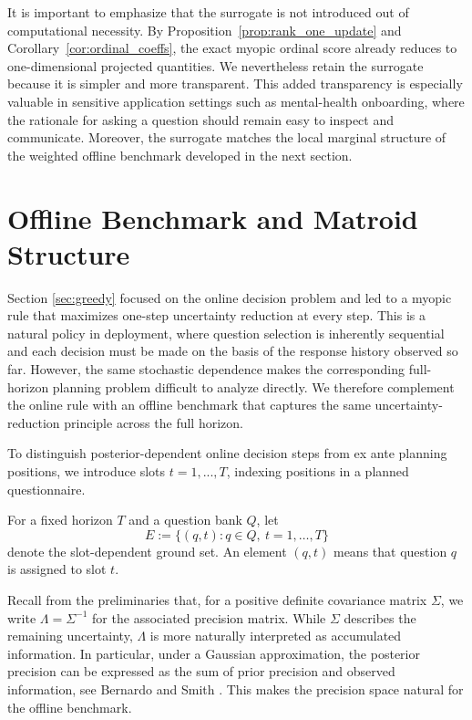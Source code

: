 \documentclass{article}
\begin{document}
It is important to emphasize that the surrogate is not introduced out of
computational necessity. By Proposition~\ref{prop:rank_one_update} and
Corollary~\ref{cor:ordinal_coeffs}, the exact myopic ordinal score already reduces
to one-dimensional projected quantities. We nevertheless retain the surrogate
because it is simpler and more transparent. This added
transparency is especially valuable in sensitive application settings such as
mental-health onboarding, where the rationale for asking a question should remain
easy to inspect and communicate. Moreover, the surrogate matches the local marginal
structure of the weighted offline benchmark developed in the next section.

\section{Offline Benchmark and Matroid Structure}
Section \ref{sec:greedy} focused on the online decision problem and led to a myopic rule that
maximizes one-step uncertainty reduction at every step. This is a natural policy
in deployment, where question selection is inherently sequential and each decision must be made
on the basis of the response history observed so far.  However, the same stochastic dependence makes the corresponding full-horizon planning problem difficult to analyze directly. We therefore complement the online rule with an offline benchmark that captures the same uncertainty-reduction principle across the full horizon.

To distinguish posterior-dependent online decision steps from ex ante planning positions, we introduce slots $t = 1,...,T$, indexing positions in a planned questionnaire.

\begin{definition}
    For a fixed horizon $T$ and a question bank $Q$, let
    \begin{equation}
        E := \{(q,t) : q \in Q,\ t = 1,\dots,T\}
    \end{equation}
    denote the slot-dependent ground set. An element $(q,t)$ means that question $q$ is assigned to slot $t$.
\end{definition}

Recall from the preliminaries that, for a positive definite covariance matrix 
$\Sigma$, we write $\Lambda = \Sigma^{-1}$ for the associated precision matrix. 
While $\Sigma$ describes the remaining uncertainty, $\Lambda$ is more naturally interpreted as accumulated information. In particular, under a Gaussian approximation, the posterior precision can be expressed as the sum of prior precision and observed information, see Bernardo and Smith \cite{bernardo1994bayesian}.
This makes the precision space natural for the offline benchmark.
\end{document}
